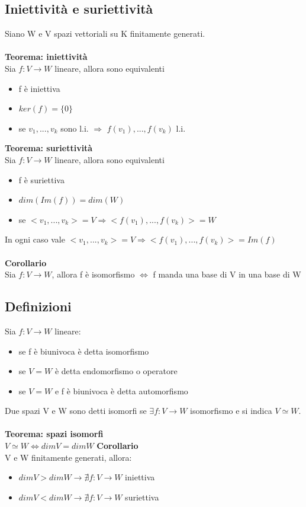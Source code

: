\documentclass{article}
\begin{document}
\subsection{Iniettività e suriettività}
Siano W e V spazi vettoriali su K finitamente generati.\\\\
\textbf{Teorema: iniettività}\\
Sia $f:V\rightarrow W$ lineare, allora sono equivalenti
\begin{itemize}
    \item f è iniettiva
    \item $ker(f)=\{0\}$
    \item se $v_1,...,v_k$ sono l.i. $\Rightarrow$ $f(v_1),...,f(v_k)$ l.i.
\end{itemize}
\textbf{Teorema: suriettività}\\
Sia $f:V\rightarrow W$ lineare, allora sono equivalenti
\begin{itemize}
    \item f è suriettiva
    \item $dim(Im(f))=dim(W)$
    \item se $<v_1,...,v_k>=V\Rightarrow<f(v_1),...,f(v_k)>=W$
\end{itemize}
In ogni caso vale $<v_1,...,v_k>=V\Rightarrow<f(v_1),...,f(v_k)>=Im(f)$\\\\
\textbf{Corollario}\\
Sia $f:V\rightarrow W$, allora f è isomorfismo $\Leftrightarrow$ f manda una base di V in una base di W

\subsection{Definizioni}
Sia $f:V\rightarrow W$ lineare:
\begin{itemize}
    \item se f è biunivoca è detta isomorfismo
    \item se $V=W$ è detta endomorfismo o operatore
    \item se $V=W$ e f è biunivoca è detta automorfismo
\end{itemize}
Due spazi V e W sono detti isomorfi se $\exists f:V\rightarrow W$ isomorfismo e si indica $V\simeq W$.\\\\
\textbf{Teorema: spazi isomorfi}\\
$V\simeq W\Leftrightarrow dimV=dimW$
\textbf{Corollario}\\
V e W finitamente generati, allora:
\begin{itemize}
    \item $dimV>dimW\rightarrow\nexists f:V\rightarrow W$ iniettiva
    \item $dimV<dimW\rightarrow\nexists f:V\rightarrow W$ suriettiva
\end{itemize}
\end{document}
